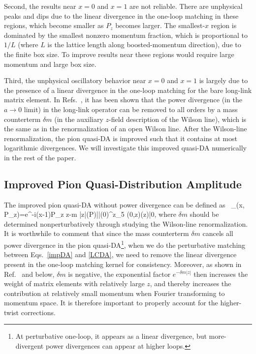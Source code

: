 Second, the results near $x=0$ and $x=1$ are not reliable. There are unphysical peaks and dips due to the linear divergence in the one-loop matching in these regions, which become smaller as $P_z$ becomes larger. The smallest-$x$ region is dominated by the smallest nonzero momentum fraction, which is proportional to $1/L$ (where $L$ is the lattice length along boosted-momentum direction), due to the finite box size. To improve results near these regions would require large momentum and large box size.

Third, the unphysical oscillatory behavior near $x=0$ and $x=1$ is largely due to the presence of a linear divergence in the one-loop matching for the bare long-link matrix element. In Refs.~\cite{Ishikawa:2016znu,Chen:2016fxx}, it has been shown that the power divergence (in the $a \to 0$ limit) in the long-link operator can be removed to all orders by a mass counterterm $\delta m$ (in the auxiliary $z$-field description of the Wilson line), which is the same as in the renormalization of an open Wilson line. After
the Wilson-line renormalization, the pion quasi-DA is improved such that it contains at most logarithmic
divergences. We will investigate this improved quasi-DA numerically in the rest of the paper. 

\subsection{Improved Pion Quasi-Distribution Amplitude}
The improved pion quasi-DA without power divergence can be defined as~\cite{Chen:2016fxx}
\beq\label{impDA}
{\tilde \phi}_{}(x, P_z)=\int{}e^{-i(x-1)P_z z-\delta m |z|}\langle \pi(P)|\bar\psi(0)\gamma^z\gamma_5 \Gamma(0,z)\psi(z)|0\rangle ,
\eeq
where $\delta m$ should be determined nonperturbatively through studying the Wilson-line renormalization. It is worthwhile to comment that since the mass counterterm $\delta m$ cancels all power divergence in the pion quasi-DA\footnote{At perturbative one-loop, it appears as a linear divergence, but more-divergent power divergences can appear at higher loops.}, when we do the perturbative matching between Eqs.~\ref{impDA} and \ref{LCDA}, we need to remove the linear divergence present in the one-loop matching kernel for consistency. Moreover, as shown in Ref.~\cite{Chen:2016fxx} and below, $\delta m$ is negative, the exponential factor $e^{-\delta m |z|}$ then increases the weight of matrix elements with relatively large
$z$, and thereby increases the contribution at relatively small momentum when Fourier
transforming to momentum space. It is therefore important to properly account for the higher-twist corrections.

